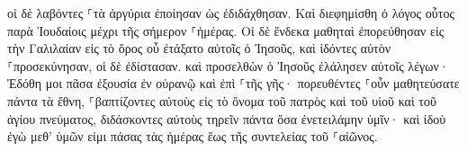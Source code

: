 \documentclass{openreader}
\begin{document}
οἱ δὲ λαβόντες ⸀τὰ ἀργύρια ἐποίησαν ὡς ἐδιδάχθησαν. Καὶ διεφημίσθη ὁ λόγος οὗτος παρὰ Ἰουδαίοις μέχρι τῆς σήμερον ⸀ἡμέρας. 
Οἱ δὲ ἕνδεκα μαθηταὶ ἐπορεύθησαν εἰς τὴν Γαλιλαίαν εἰς τὸ ὄρος οὗ ἐτάξατο αὐτοῖς ὁ Ἰησοῦς, 
καὶ ἰδόντες αὐτὸν ⸀προσεκύνησαν, οἱ δὲ ἐδίστασαν. 
καὶ προσελθὼν ὁ Ἰησοῦς ἐλάλησεν αὐτοῖς λέγων· Ἐδόθη μοι πᾶσα ἐξουσία ἐν οὐρανῷ καὶ ἐπὶ ⸀τῆς γῆς· 
πορευθέντες ⸀οὖν μαθητεύσατε πάντα τὰ ἔθνη, ⸀βαπτίζοντες αὐτοὺς εἰς τὸ ὄνομα τοῦ πατρὸς καὶ τοῦ υἱοῦ καὶ τοῦ ἁγίου πνεύματος, 
διδάσκοντες αὐτοὺς τηρεῖν πάντα ὅσα ἐνετειλάμην ὑμῖν· καὶ ἰδοὺ ἐγὼ μεθ’ ὑμῶν εἰμι πάσας τὰς ἡμέρας ἕως τῆς συντελείας τοῦ ⸀αἰῶνος. 
\end{document}
